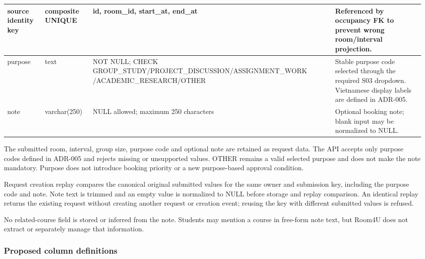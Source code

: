 \begin{longtable}{|p{}|p{}|p{}|p{}|}
source identity key & composite UNIQUE & id, room\allowbreak\_\allowbreak{}id, start\allowbreak\_\allowbreak{}at, end\allowbreak\_\allowbreak{}at & Referenced by occupancy FK to prevent wrong room/\allowbreak{}interval projection. \\ \hline

purpose & text & NOT NULL; CHECK GROUP\allowbreak\_\allowbreak{}STUDY/\allowbreak{}PROJECT\allowbreak\_\allowbreak{}DISCUSSION/\allowbreak{}ASSIGNMENT\allowbreak\_\allowbreak{}WORK /\allowbreak{}ACADEMIC\allowbreak\_\allowbreak{}RESEARCH/\allowbreak{}OTHER & Stable purpose code selected through the required S03 dropdown. Vietnamese display labels are defined in ADR-005. \\ \hline

note & varchar(250) & NULL allowed; maximum 250 characters & Optional booking note; blank input may be normalized to NULL. \\ \hline

\end{longtable}

\vspace{2mm}

The submitted room, interval, group size, purpose code and optional note are retained as request data. The API accepts only purpose codes defined in ADR-005 and rejects missing or unsupported values. OTHER remains a valid selected purpose and does not make the note mandatory. Purpose does not introduce booking priority or a new purpose-based approval condition.\par

Request creation replay compares the canonical original submitted values for the same owner and submission key, including the purpose code and note. Note text is trimmed and an empty value is normalized to NULL before storage and replay comparison. An identical replay returns the existing request without creating another request or creation event; reusing the key with different submitted values is refused.\par

No related-course field is stored or inferred from the note. Students may mention a course in free-form note text, but Room4U does not extract or separately manage that information.\par

\subsubsection{Proposed column definitions}


